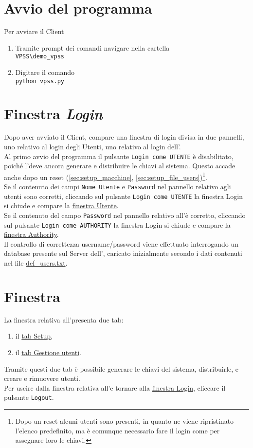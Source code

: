 \documentclass[a4paper,twoside,10pt,openany]{scrbook}
\begin{document}
\section{Avvio del programma}
Per avviare il Client 
\begin{enumerate}
 \item Tramite prompt dei comandi navigare nella cartella \\
       \texttt{VPSS\textbackslash demo\_vpss}
 \item Digitare il comando\\
       \texttt{python vpss.py}
\end{enumerate}
%
\section{Finestra \emph{Login}}\label{sec:window_login}
%
Dopo aver avviato il Client, compare una finestra di login divisa in due pannelli, uno relativo al login degli Utenti, uno relativo al login dell'\auth.\\
Al primo avvio del programma il pulsante \texttt{Login come UTENTE} è disabilitato, poiché l'\auth deve ancora generare e distribuire le chiavi al sistema.
Questo accade anche dopo un reset (\ref{sec:setup_macchine}, \ref{sec:setup_file_users})\footnote{Dopo un reset alcuni utenti sono presenti, in quanto ne viene ripristinato l'elenco predefinito, ma è comunque necessario fare il login come \auth per assegnare loro le chiavi.}.\\
Se il contenuto dei campi \texttt{Nome Utente} e \texttt{Password} nel pannello relativo agli utenti sono corretti, cliccando sul pulsante \texttt{Login come UTENTE} la finestra Login si chiude e compare la \hyperref[sec:window_user]{finestra Utente}.\\
Se il contenuto del campo \texttt{Password} nel pannello relativo all'\auth è corretto, cliccando sul pulsante \texttt{Login come AUTHORITY} la finestra Login si chiude e compare la \hyperref[sec:window_authority]{finestra Authority}.\\
Il controllo di correttezza username/password viene effettuato interrogando un database presente sul Server dell'\auth, caricato inizialmente secondo i dati contenuti nel file \hyperref[sec:file_users]{def\_users.txt}.
%
\section{Finestra \emph{\auth}}\label{sec:window_authority}
%
La finestra relativa all'\auth presenta due tab:
\begin{enumerate}
 \item il \hyperref[sec:tab_setup]{tab Setup},
 \item il \hyperref[sec:tab_gestione]{tab Gestione utenti}.
\end{enumerate}
Tramite questi due tab è possibile generare le chiavi del sistema, distribuirle,
e creare e rimuovere utenti.\\
Per uscire dalla finestra relativa all'\auth e tornare alla \hyperref[sec:window_login]{finestra Login}, cliccare il pulsante \texttt{Logout}.
%
\end{document}
